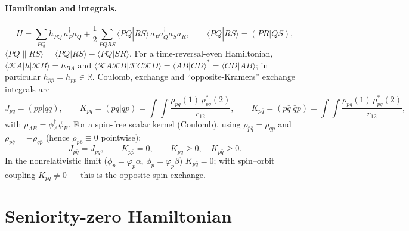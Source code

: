 \documentclass[11pt,a4paper]{article}
\newcommand{\kb}[1]{\bar{#1}}                 %
\newcommand{\asym}[4]{\langle #1 #2 \| #3 #4 \rangle}
\newcommand{\dir}[4]{\langle #1 #2 | #3 #4 \rangle}
\begin{document}
\paragraph{Hamiltonian and integrals.}
\begin{equation}
  H=\sum_{PQ} h_{PQ}\,a^\dagger_P a_Q+\frac12\sum_{PQRS}\dir PQRS\, a^\dagger_P a^\dagger_Q a_S a_R ,
  \qquad \dir PQRS = (PR|QS),
\end{equation}
$\asym PQRS=\dir PQRS-\dir PQSR$.
For a time-reversal-even Hamiltonian, $\langle\mathcal K A|h|\mathcal K B\rangle=h_{BA}$ and
$\dir{\mathcal KA}{\mathcal KB}{\mathcal KC}{\mathcal KD}=\dir ABCD^{*}=\dir CDAB$; in particular
$h_{\kb p\kb p}=h_{pp}\in\mathbb R$.
Coulomb, exchange and ``opposite-Kramers'' exchange integrals are
\begin{equation}
  J_{pq}=(pp|qq),\qquad K_{pq}=(pq|qp)=\!\int\!\!\int\frac{\rho_{pq}(1)\,\rho_{pq}^{*}(2)}{r_{12}},\qquad
  K_{p\kb q}=(p\kb q|\kb q p)=\!\int\!\!\int\frac{\rho_{p\kb q}(1)\,\rho_{p\kb q}^{*}(2)}{r_{12}},
\end{equation}
with $\rho_{AB}=\phi_A^\dagger\phi_B$. For a spin-free scalar kernel (Coulomb), using
$\rho_{\kb p\kb q}=\rho_{qp}$ and $\rho_{p\kb q}=-\rho_{q\kb p}$ (hence $\rho_{p\kb p}\equiv 0$ pointwise):
\begin{equation}
  J_{p\kb q}=J_{pq},\qquad K_{p\kb p}=0,\qquad K_{pq}\ge 0,\quad K_{p\kb q}\ge 0 .
  \label{eq:coulrel}
\end{equation}
In the nonrelativistic limit ($\phi_p=\varphi_p\alpha$, $\phi_{\kb p}=\varphi_p\beta$) $K_{p\kb q}=0$;
with spin--orbit coupling $K_{p\kb q}\neq 0$ --- this is the opposite-spin exchange.

\section{Seniority-zero Hamiltonian}
\end{document}
